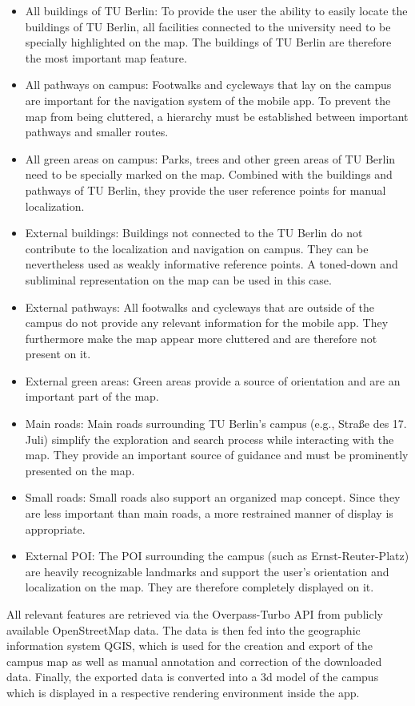 \begin{itemize}
    \item All buildings of TU Berlin: To provide the user the ability to easily locate the buildings of TU Berlin, all facilities connected to the university need to be specially highlighted on the map. The buildings of TU Berlin are therefore the most important map feature.
    \item All pathways on campus: Footwalks and cycleways that lay on the campus are important for the navigation system of the mobile app. To prevent the map from being cluttered, a hierarchy must be established between important pathways and smaller routes.
    \item All green areas on campus: Parks, trees and other green areas of TU Berlin need to be specially marked on the map. Combined with the buildings and pathways of TU Berlin, they provide the user reference points for manual localization.
    \item External buildings: Buildings not connected to the TU Berlin do not contribute to the localization and navigation on campus. They can be nevertheless used as weakly informative reference points. A toned-down and subliminal representation on the map can be used in this case.
    \item External pathways: All footwalks and cycleways that are outside of the campus do not provide any relevant information for the mobile app. They furthermore make the map appear more cluttered and are therefore not present on it.
    \item External green areas: Green areas provide a source of orientation and are an important part of the map.
    \item Main roads: Main roads surrounding TU Berlin's campus (e.g., Straße des 17. Juli) simplify the exploration and search process while interacting with the map. They provide an important source of guidance and must be prominently presented on the map.
    \item Small roads: Small roads also support an organized map concept. Since they are less important than main roads, a more restrained manner of display is appropriate.
    \item External POI: The POI surrounding the campus (such as Ernst-Reuter-Platz) are heavily recognizable landmarks and support the user's orientation and localization on the map. They are therefore completely displayed on it.
\end{itemize}

All relevant features are retrieved via the Overpass-Turbo API from publicly available OpenStreetMap data. The data is then fed into the geographic information system QGIS, which is used for the creation and export of the campus map as well as manual annotation and correction of the downloaded data. Finally, the exported data is converted into a 3d model of the campus which is displayed in a respective rendering environment inside the app.

